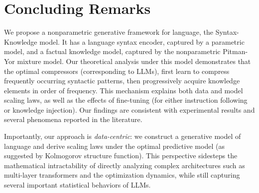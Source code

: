 \documentclass[11pt]{article}
\theoremstyle{plain}
\theoremstyle{definition}
\begin{document}



\section{Concluding Remarks}
\label{sec:Concluding Remarks}

\begin{arxiv}
We propose a nonparametric generative framework for language, the Syntax-Knowledge model. It has a language syntax encoder,
captured by a parametric model, and a factual knowledge model, captured by the nonparametric 
Pitman-Yor mixture model. Our theoretical analysis under this model demonstrates that the optimal compressors (corresponding to LLMs), first learn to compress frequently occurring syntactic patterns, then progressively acquire knowledge elements in order of frequency. This mechanism explains both data and model scaling laws, as well as the effects of fine-tuning (for either instruction following or knowledge injection). Our findings are consistent with experimental results and several phenomena reported in the literature.

Importantly, our approach is {\em data-centric}: we construct a generative model of language and derive scaling laws under the optimal predictive model (as suggested by Kolmogorov structure function). This perspective sidesteps the mathematical intractability of directly analyzing complex architectures such as multi-layer transformers and the optimization dynamics, while still capturing several important statistical behaviors of LLMs.
\end{arxiv}
\end{document}
